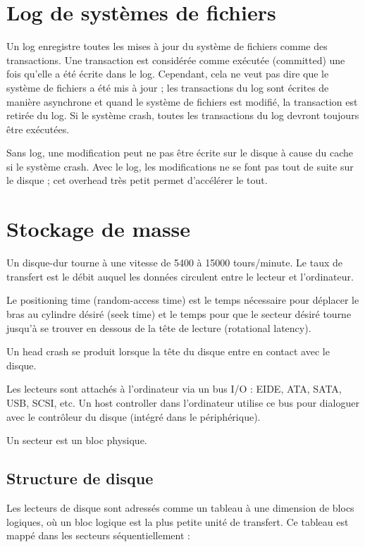 	
\section{Log de systèmes de fichiers}

Un log enregistre toutes les mises à jour du système de fichiers comme des transactions. Une transaction est considérée comme exécutée (committed) une fois qu'elle a été écrite dans le log. Cependant, cela ne veut pas dire que le système de fichiers a été mis à jour ; les transactions du log sont écrites de manière asynchrone  et quand le système de fichiers est modifié, la transaction est retirée du log. Si le système crash, toutes les transactions du log devront toujours être exécutées.

Sans log, une modification peut ne pas être écrite sur le disque à cause du cache si le système crash. Avec le log, les modifications ne se font pas tout de suite sur le disque ; cet overhead très petit permet d'accélérer le tout.

\section{Stockage de masse}

Un disque-dur tourne à une vitesse de 5400 à 15000 tours/minute. Le taux de transfert est le débit auquel les données circulent entre le lecteur et l'ordinateur.

Le positioning time (random-access time) est le temps nécessaire pour déplacer le bras au cylindre désiré (seek time) et le temps pour que le secteur désiré tourne jusqu'à se trouver en dessous de la tête de lecture (rotational latency).

Un head crash se produit lorsque la tête du disque entre en contact avec le disque.

Les lecteurs sont attachés à l'ordinateur via un bus I/O : EIDE, ATA, SATA, USB, SCSI, etc. Un host controller dans l'ordinateur utilise ce bus pour dialoguer avec le contrôleur du disque (intégré dans le périphérique).

Un secteur est un bloc physique.


	\subsection{Structure de disque}
	
	Les lecteurs de disque sont adressés comme un tableau à une dimension de blocs logiques, où un bloc logique est la plus petite unité de transfert. Ce tableau est mappé dans les secteurs séquentiellement :
	

